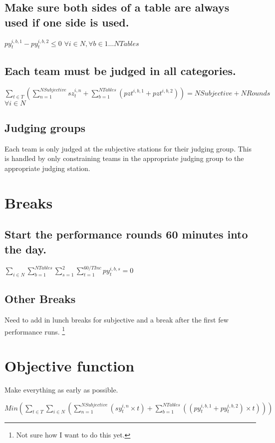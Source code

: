 \documentclass[letterpaper,11pt]{report}
\newcommand{\doccomment}[3]%
{\marginpar{\textcolor{#2}{\bf #1}}%
\footnote{{\color{#2}#3}}%
}
\newcommand{\doccomment}[3]{}
\newcommand{\jpscomment}[1]%
{\doccomment{SCHEWE}{Bittersweet}{#1}}
\begin{document}
\subsection{Make sure both sides of a table are always used if one side is
  used.}
$py_{t}^{i,b,1} - py_{t}^{i,b,2} \le 0$
\hfill $\forall i \in N,
\forall b \in 1 \dots NTables$


\subsection{Each team must be judged in all categories.}
$\sum\limits_{t \in T} ( 
    \sum\limits_{n=1}^{NSubjective} sz_{t}^{i,n}  
 + \sum\limits_{b=1}^{NTables} (pz{t}^{i,b,1} + pz{t}^{i,b,2})
)
= NSubjective + NRounds$
\hfill $\forall i \in N$


\subsection{Judging groups}
Each team is only judged at the subjective stations for their judging
group. This is handled by only constraining teams in the appropriate
judging group to the appropriate judging station.


\section{Breaks}
\subsection{Start the performance rounds 60 minutes into the day.}
$\sum\limits_{i \in N} \sum\limits_{b=1}^{NTables} \sum\limits_{s=1}^{2} \sum\limits_{t = 1}^{60/TInc} py_{t}^{i,b,s} = 0$

\subsection{Other Breaks}
Need to add in lunch breaks for subjective and a break after the first few
performance runs. \jpscomment{Not sure how I want to do this yet.}

\section{Objective function}
Make everything as early as possible.

$Min ( 
\sum\limits_{t \in T}
  \sum\limits_{i \in N} (
    \sum\limits_{n=1}^{NSubjective}
      ( sy_{t}^{i,n} \times t )
  + \sum\limits_{b=1}^{NTables} ( ( py_{t}^{i,b,1} + py_{t}^{i,b,2} )
  \times t)
  )
) $
\end{document}
